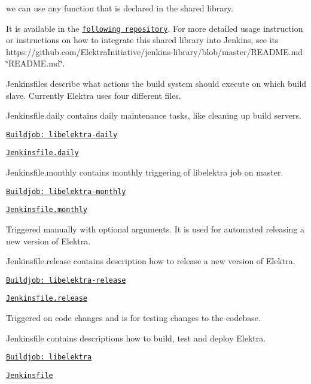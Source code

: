 we can use any function that is declared in the shared library.

It is available in the \href{https://github.com/ElektraInitiative/jenkins-library}{\tt following repository}. For more detailed usage instruction or instructions on how to integrate this shared library into Jenkins, see its https\+://github.com/\+Elektra\+Initiative/jenkins-\/library/blob/master/\+R\+E\+A\+D\+M\+E.\+md \char`\"{}\+R\+E\+A\+D\+M\+E.\+md\char`\"{}.

Jenkinsfiles describe what actions the build system should execute on which build slave. Currently Elektra uses four different files.


\begin{DoxyItemize}
\item Jenkinsfile.daily contains daily maintenance tasks, like cleaning up build servers.
\item \href{https://build.libelektra.org/job/libelektra-daily/}{\tt Buildjob\+: libelektra-\/daily}
\item \href{https://master.libelektra.org/scripts/jenkins/Jenkinsfile.daily}{\tt Jenkinsfile.\+daily}
\end{DoxyItemize}


\begin{DoxyItemize}
\item Jenkinsfile.monthly contains monthly triggering of libelektra job on master.
\item \href{https://build.libelektra.org/job/libelektra-monthly/}{\tt Buildjob\+: libelektra-\/monthly}
\item \href{https://master.libelektra.org/scripts/jenkins/Jenkinsfile.monthly}{\tt Jenkinsfile.\+monthly}
\end{DoxyItemize}


\begin{DoxyItemize}
\item Triggered manually with optional arguments. It is used for automated releasing a new version of Elektra.
\item Jenkinsfile.release contains description how to release a new version of Elektra.
\item \href{https://build.libelektra.org/job/libelektra-release/}{\tt Buildjob\+: libelektra-\/release}
\item \href{https://master.libelektra.org/scripts/jenkins/Jenkinsfile.release}{\tt Jenkinsfile.\+release}
\end{DoxyItemize}


\begin{DoxyItemize}
\item Triggered on code changes and is for testing changes to the codebase.
\item Jenkinsfile contains descriptions how to build, test and deploy Elektra.
\item \href{https://build.libelektra.org/job/libelektra/}{\tt Buildjob\+: libelektra}
\item \href{https://master.libelektra.org/scripts/jenkins/Jenkinsfile}{\tt Jenkinsfile}
\end{DoxyItemize}

